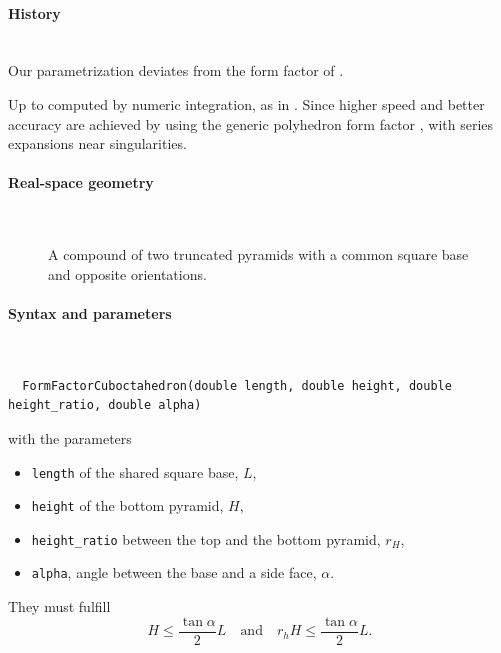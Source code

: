 \paragraph{History}\strut\\
Our parametrization deviates from the form factor  of \IsGISAXS
\cite[Eq.~2.32]{Laz08} \cite[Eq.~222]{ReLL09}.

Up to  computed by numeric integration, as in \IsGISAXS.
Since  higher speed and better accuracy are achieved
by using the generic polyhedron form factor \cite{ba:ffp},
with series expansions near singularities.

 \label{SCuboctahedron}

\paragraph{Real-space geometry}\strut\\

\begin{figure}[H]
\hfill
{}
\hfill
{}
\hfill
{}
\hfill
\caption{A compound of two truncated pyramids with a common square base
and opposite orientations.}
\end{figure}

\FloatBarrier

\paragraph{Syntax and parameters}\strut\\[-2ex plus .2ex minus .2ex]
\begin{lstlisting}
  FormFactorCuboctahedron(double length, double height, double height_ratio, double alpha)
\end{lstlisting}
with the parameters
\begin{itemize}
\item \texttt{length} of the shared square base, $L$,
\item \texttt{height} of the bottom pyramid, $H$,
\item \texttt{height\_ratio} between the top and the bottom pyramid, $r_H$,
\item \texttt{alpha}, angle between the base and a side face, $\alpha$.
\end{itemize}
They must fulfill
\begin{displaymath}
  H \le \frac{\tan\alpha}{2} L
  \quad\text{and}\quad
  r_h H \le \frac{\tan\alpha}{2} L.
\end{displaymath}

